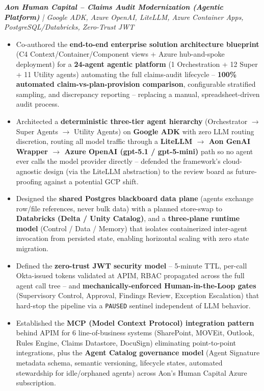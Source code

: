 \documentclass[letterpaper,10pt]{article}
\newcommand{\resumeItem}[1]{
  \item\small{
    {#1 \vspace{-2pt}}
  }
}
\newcommand{\resumeItemListStart}{\begin{itemize}}
\newcommand{\resumeItemListEnd}{\end{itemize}\vspace{-5pt}}
\begin{document}
    \vspace{12pt}
    \vspace{12pt}
\textit{\small\textbf{Aon Human Capital -- Claims Audit Modernization (Agentic Platform)} | Google ADK, Azure OpenAI, LiteLLM, Azure Container Apps, PostgreSQL/Databricks, Zero-Trust JWT}
\resumeItemListStart
  \resumeItem{Co-authored the \textbf{end-to-end enterprise solution architecture blueprint} (C4 Context/Container/Component views + Azure hub-and-spoke deployment) for a \textbf{24-agent agentic platform} (1 Orchestration + 12 Super + 11 Utility agents) automating the full claims-audit lifecycle -- \textbf{100\% automated claim-vs-plan-provision comparison}, configurable stratified sampling, and discrepancy reporting -- replacing a manual, spreadsheet-driven audit process.}
  \resumeItem{Architected a \textbf{deterministic three-tier agent hierarchy} (Orchestrator $\rightarrow$ Super Agents $\rightarrow$ Utility Agents) on \textbf{Google ADK} with zero LLM routing discretion, routing all model traffic through a \textbf{LiteLLM $\rightarrow$ Aon GenAI Wrapper $\rightarrow$ Azure OpenAI (gpt-5.1 / gpt-5-mini)} path so no agent ever calls the model provider directly -- defended the framework's cloud-agnostic design (via the LiteLLM abstraction) to the review board as future-proofing against a potential GCP shift.}
  \resumeItem{Designed the \textbf{shared Postgres blackboard data plane} (agents exchange row/file references, never bulk data) with a planned store-swap to \textbf{Databricks (Delta / Unity Catalog)}, and a \textbf{three-plane runtime model} (Control / Data / Memory) that isolates containerized inter-agent invocation from persisted state, enabling horizontal scaling with zero state migration.}
  \resumeItem{Defined the \textbf{zero-trust JWT security model} -- 5-minute TTL, per-call Okta-issued tokens validated at APIM, RBAC propagated across the full agent call tree -- and \textbf{mechanically-enforced Human-in-the-Loop gates} (Supervisory Control, Approval, Findings Review, Exception Escalation) that hard-stop the pipeline via a \texttt{PAUSED} sentinel independent of LLM behavior.}
  \resumeItem{Established the \textbf{MCP (Model Context Protocol) integration pattern} behind APIM for 6 line-of-business systems (SharePoint, MOVEit, Outlook, Rules Engine, Claims Datastore, DocuSign) eliminating point-to-point integrations, plus the \textbf{Agent Catalog governance model} (Agent Signature metadata schema, semantic versioning, lifecycle states, automated stewardship for idle/orphaned agents) across Aon's Human Capital Azure subscription.}
\resumeItemListEnd
    \vspace{12pt}
\vspace{12pt}
\end{document}
